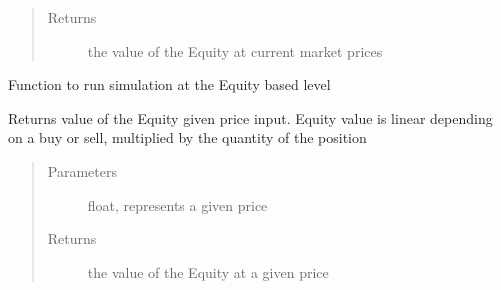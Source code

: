 \documentclass[letterpaper,10pt,english]{sphinxmanual}
\begin{document}
\begin{fulllineitems}
\begin{fulllineitems}
\begin{quote}
\begin{description}
\item[{Returns}] \leavevmode
\sphinxAtStartPar
the value of the Equity at current market prices

\end{description}\end{quote}

\end{fulllineitems}


\begin{fulllineitems}
\label{\detokenize{securities:risk_dash.securities.Equity.simulate}}
\sphinxAtStartPar
Function to run simulation at the Equity based level

\end{fulllineitems}


\begin{fulllineitems}
\label{\detokenize{securities:risk_dash.securities.Equity.valuation}}
\sphinxAtStartPar
Returns value of the Equity given price input. Equity value is linear depending on a buy or sell, multiplied by the quantity of the position
\begin{quote}\begin{description}
\item[{Parameters}] \leavevmode
\sphinxAtStartPar
{} \textendash{} float, represents a given price

\item[{Returns}] \leavevmode
\sphinxAtStartPar
the value of the Equity at a given price

\end{description}\end{quote}

\end{fulllineitems}


\end{fulllineitems}

\end{document}

